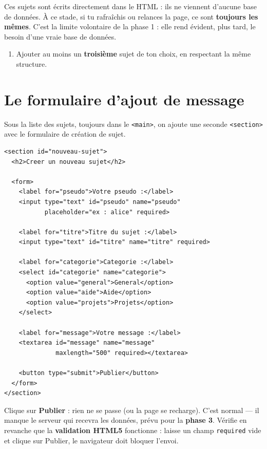 \documentclass[a4paper,11pt]{article}
\begin{document}
\begin{tcolorbox}[attention, title={« Codé en dur » --- pourquoi ?}]
Ces sujets sont écrits directement dans le HTML : ils ne viennent d'aucune base de données. À ce stade, si tu rafraîchis ou relances la page, ce sont \textbf{toujours les mêmes}. C'est la limite volontaire de la phase 1 : elle rend évident, plus tard, le besoin d'une vraie base de données.
\end{tcolorbox}

\begin{enumerate}[resume]
  \item Ajouter au moins un \textbf{troisième} sujet de ton choix, en respectant la même structure.
\end{enumerate}

\section{Le formulaire d'ajout de message}

Sous la liste des sujets, toujours dans le \texttt{<main>}, on ajoute une seconde \texttt{<section>} avec le formulaire de création de sujet.

\begin{lstlisting}[language=HTML5, caption={Formulaire de nouveau sujet}]
<section id="nouveau-sujet">
  <h2>Creer un nouveau sujet</h2>

  <form>
    <label for="pseudo">Votre pseudo :</label>
    <input type="text" id="pseudo" name="pseudo"
           placeholder="ex : alice" required>

    <label for="titre">Titre du sujet :</label>
    <input type="text" id="titre" name="titre" required>

    <label for="categorie">Categorie :</label>
    <select id="categorie" name="categorie">
      <option value="general">General</option>
      <option value="aide">Aide</option>
      <option value="projets">Projets</option>
    </select>

    <label for="message">Votre message :</label>
    <textarea id="message" name="message"
              maxlength="500" required></textarea>

    <button type="submit">Publier</button>
  </form>
</section>
\end{lstlisting}

\begin{tcolorbox}[attention, title={Le formulaire ne « part » nulle part}]
Clique sur \textbf{Publier} : rien ne se passe (ou la page se recharge). C'est normal --- il manque le serveur qui recevra les données, prévu pour la \textbf{phase 3}. Vérifie en revanche que la \textbf{validation HTML5} fonctionne : laisse un champ \texttt{required} vide et clique sur Publier, le navigateur doit bloquer l'envoi.
\end{tcolorbox}
\end{document}
